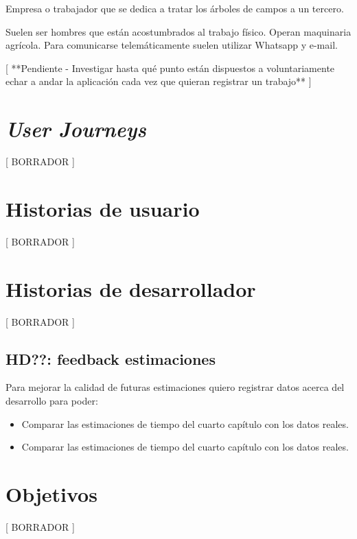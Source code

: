 Empresa o trabajador que se dedica a tratar los árboles de campos a un tercero.

Suelen ser hombres que están acostumbrados al trabajo físico. Operan maquinaria
agrícola. Para comunicarse telemáticamente suelen utilizar Whatsapp y e-mail.

[ **Pendiente - Investigar hasta qué punto están dispuestos a voluntariamente
echar a andar la aplicación cada vez que quieran registrar un trabajo** ]

\section{\textit{User Journeys}}

[ BORRADOR ]

\section{Historias de usuario}

[ BORRADOR ]

\section{Historias de desarrollador}

[ BORRADOR ]
\subsection{HD??: feedback estimaciones}
Para mejorar la calidad de futuras estimaciones quiero registrar datos acerca del desarrollo
para poder:

\begin{itemize}
    \item Comparar las estimaciones de tiempo del cuarto capítulo con los datos reales.
    \item Comparar las estimaciones de tiempo del cuarto capítulo con los datos reales.
\end{itemize}

\section{Objetivos}

[ BORRADOR ]
